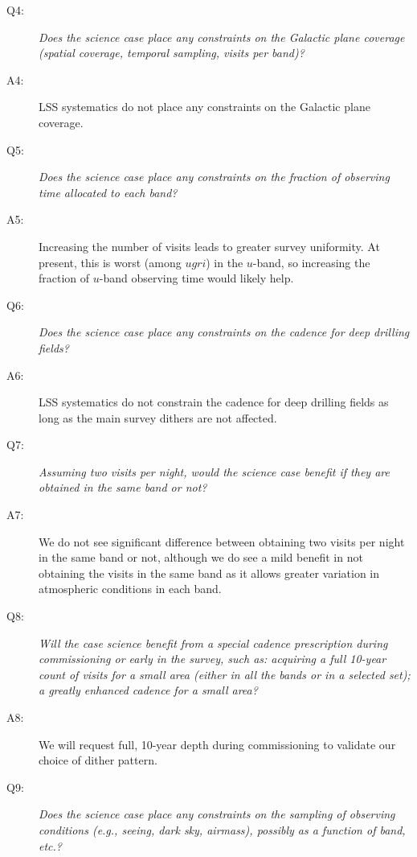 \begin{description}
\item[Q4:] {\it Does the science case place any constraints on the
Galactic plane coverage (spatial coverage, temporal sampling, visits per
band)?}

\item[A4:] LSS systematics do not place any constraints on the Galactic
plane coverage.

\item[Q5:] {\it Does the science case place any constraints on the
fraction of observing time allocated to each band?}

\item[A5:] Increasing the number of visits leads to greater survey
uniformity. At present, this is worst (among $ugri$) in the $u$-band, so
increasing the fraction of $u$-band observing time would likely help.

\item[Q6:] {\it Does the science case place any constraints on the
cadence for deep drilling fields?}

\item[A6:] LSS systematics do not constrain the cadence for deep
drilling fields as long as the main survey dithers are not affected.

\item[Q7:] {\it Assuming two visits per night, would the science case
benefit if they are obtained in the same band or not?}

\item[A7:] We do not see significant difference between obtaining two
visits per night in the same band or not, although we do see a mild
benefit in not obtaining the visits in the same band as it allows
greater variation in atmospheric conditions in each band.

\item[Q8:] {\it Will the case science benefit from a special cadence
prescription during commissioning or early in the survey, such as:
acquiring a full 10-year count of visits for a small area (either in all
the bands or in a  selected set); a greatly enhanced cadence for a small
area?}

\item[A8:] We will request full, 10-year depth during commissioning to
validate our choice of dither pattern.

\item[Q9:] {\it Does the science case place any constraints on the
sampling of observing conditions (e.g., seeing, dark sky, airmass),
possibly as a function of band, etc.?}


\end{description}
